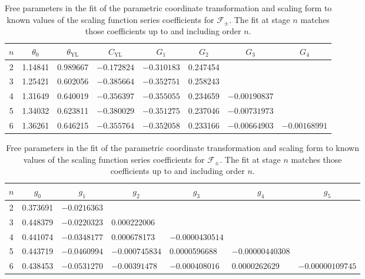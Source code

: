\documentclass[
aps,
pre,
preprint,
longbibliography,
floatfix
]{revtex4-2}
\begin{document}
\begin{table}
  \singlespacing
  \raggedright
  \begin{tabular}{|c|lllllll}
    \hline
    \multicolumn{1}{|c|}{$n$} &
      \multicolumn{1}{c}{$\theta_0$} &
      \multicolumn{1}{c}{$\theta_\mathrm{YL}$} &
      \multicolumn{1}{c}{$C_\mathrm{YL}$} &
      \multicolumn{1}{c}{$G_1$} &
      \multicolumn{1}{c}{$G_2$} &
      \multicolumn{1}{c}{$G_3$} &
      \multicolumn{1}{c}{$G_4$} \\
    \hline
    2 &
      1.14841 &
      0.989667 &
      $-0.172824$ &
      $-0.310183$ &
      0.247454 \\
    3 &
      1.25421 &
      0.602056 &
      $-0.385664$ &
      $-0.352751$ &
      0.258243 \\
    4 &
      1.31649 &
      0.640019 &
      $-0.356397$ &
      $-0.355055$ &
      0.234659 &
      $-0.00190837$ \\
    5 &
      1.34032 &
      0.623811 &
      $-0.380029$ &
      $-0.351275$ &
      0.237046 &
      $-0.00731973$ \\
    6 &
      1.36261 &
      0.646215 &
      $-0.355764$ &
      $-0.352058$ &
      0.233166 &
      $-0.00664903$ &
      $-0.00168991$ \\
      \hline
  \end{tabular}
  \begin{tabular}{|c|llllll}
    \hline
    $n$ &
      \multicolumn{1}{c}{$g_0$} &
      \multicolumn{1}{c}{$g_1$} &
      \multicolumn{1}{c}{$g_2$} &
      \multicolumn{1}{c}{$g_3$} &
      \multicolumn{1}{c}{$g_4$} &
      \multicolumn{1}{c}{$g_5$} \\
    \hline
    2 &
      0.373691 &
      $-0.0216363$ \\
    3 &
      0.448379 &
      $-0.0220323$ &
      \hphantom{$-$}0.000222006 \\
    4 &
      0.441074 &
      $-0.0348177$ &
      \hphantom{$-$}0.000678173 &
      $-0.0000430514$ \\
    5 &
      0.443719 &
      $-0.0460994$ &
      $-0.000745834$ &
      \hphantom{$-$}0.0000596688 &
      $-0.00000440308$ \\
    6 &
      0.438453 &
      $-0.0531270$ &
      $-0.00391478$ &
      $-0.000408016$ &
      \hphantom{$-$}0.0000262629 &
      $-0.00000109745$ \\
    \hline
  \end{tabular}
  \caption{
    Free parameters in the fit of the parametric coordinate transformation and
    scaling form to known values of the scaling function series coefficients
    for $\mathcal F_\pm$. The fit at stage $n$ matches those coefficients up to
    and including order $n$.
  } \label{tab:fits}
\end{table}
\end{document}
